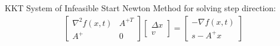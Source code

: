 \documentclass[12pt,letter]{article}
\begin{document}
\begin{enumerate}
\begin{itemize}
        
    KKT System of Infeasible Start Newton Method for solving step direction:
    \begin{align*}
      \begin{bmatrix}
        \nabla^2 f(x,t) & A^{+T}\\
        A^{+} & 0
      \end{bmatrix}
      \begin{bmatrix}
        \Delta x\\
        v
      \end{bmatrix}
      =
      \begin{bmatrix}
        -\nabla f(x,t)\\
        s-A^{+}x
      \end{bmatrix}
    \end{align*}


\end{itemize}
\end{enumerate}
\end{document}
